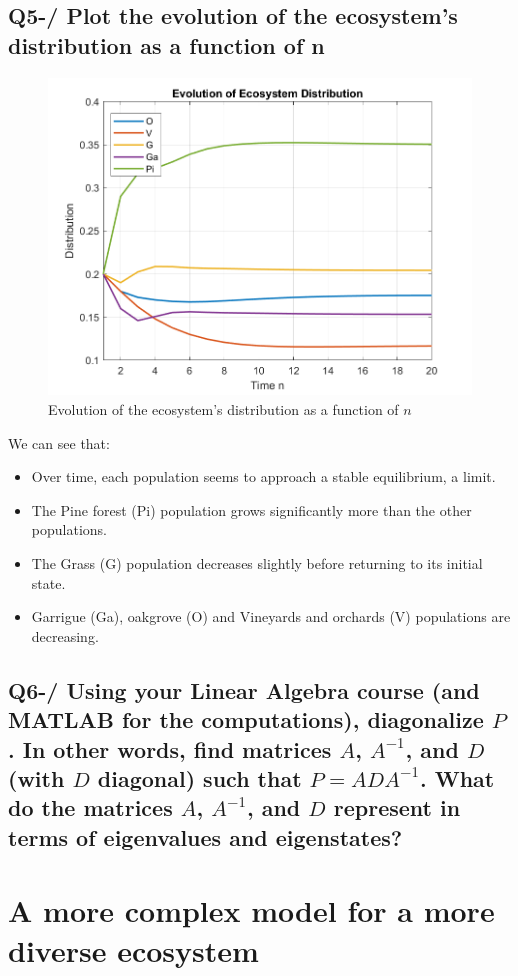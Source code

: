 \documentclass{article}
\begin{document}
    \subsection*{Q5-/ Plot the evolution of the ecosystem’s distribution as a function of n}

    \begin{figure}[h]
        \centering
        \includegraphics[width=0.7\linewidth]{ecosystem_distribution}
        \caption{\label{fig:evo}Evolution of the ecosystem’s distribution as a function of $n$}
    \end{figure}
    We can see that:
    \begin{itemize}
        \item Over time, each population seems to approach a stable equilibrium, a limit.
        \item The Pine forest (Pi) population grows significantly more than the other populations.
        \item The Grass (G) population decreases slightly before returning to its initial state.
        \item Garrigue (Ga), oakgrove (O) and Vineyards and orchards (V) populations are decreasing.
    \end{itemize}

    \subsection*{Q6-/ Using your Linear Algebra course (and MATLAB for the computations), diagonalize \( P \). In other words, find matrices \( A \), \( A^{-1} \), and \( D \) (with \( D \) diagonal) such that \( P = A D A^{-1} \). What do the matrices \( A \), \( A^{-1} \), and \( D \) represent in terms of eigenvalues and eigenstates?}


    \section*{A more complex model for a more diverse ecosystem}
\end{document}
